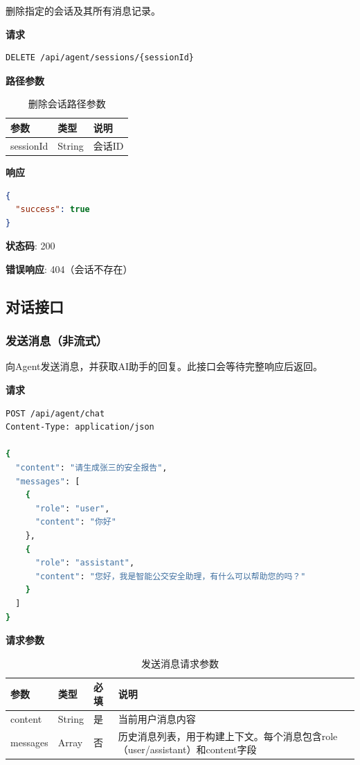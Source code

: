 \documentclass[12pt,a4paper]{article}
\begin{document}
删除指定的会话及其所有消息记录。

\textbf{请求}

\begin{lstlisting}[language=bash]
DELETE /api/agent/sessions/{sessionId}
\end{lstlisting}

\textbf{路径参数}

\begin{table}[h]
  \centering
  \begin{tabular}{lll}
    \toprule
    参数 & 类型 & 说明 \\
    \midrule
    sessionId & String & 会话ID \\
    \bottomrule
  \end{tabular}
  \caption{删除会话路径参数}
\end{table}

\textbf{响应}

\begin{lstlisting}[language=json]
{
  "success": true
}
\end{lstlisting}

\textbf{状态码}: 200

\textbf{错误响应}: 404（会话不存在）

\subsection{对话接口}

\subsubsection{发送消息（非流式）}

向Agent发送消息，并获取AI助手的回复。此接口会等待完整响应后返回。

\textbf{请求}

\begin{lstlisting}[language=bash]
POST /api/agent/chat
Content-Type: application/json

{
  "content": "请生成张三的安全报告",
  "messages": [
    {
      "role": "user",
      "content": "你好"
    },
    {
      "role": "assistant",
      "content": "您好，我是智能公交安全助理，有什么可以帮助您的吗？"
    }
  ]
}
\end{lstlisting}

\textbf{请求参数}

\begin{table}[h]
  \centering
  \begin{tabular}{llll}
    \toprule
    参数 & 类型 & 必填 & 说明 \\
    \midrule
    content & String & 是 & 当前用户消息内容 \\
    messages & Array & 否 & 历史消息列表，用于构建上下文。每个消息包含role（user/assistant）和content字段 \\
    \bottomrule
  \end{tabular}
  \caption{发送消息请求参数}
\end{table}
\end{document}
